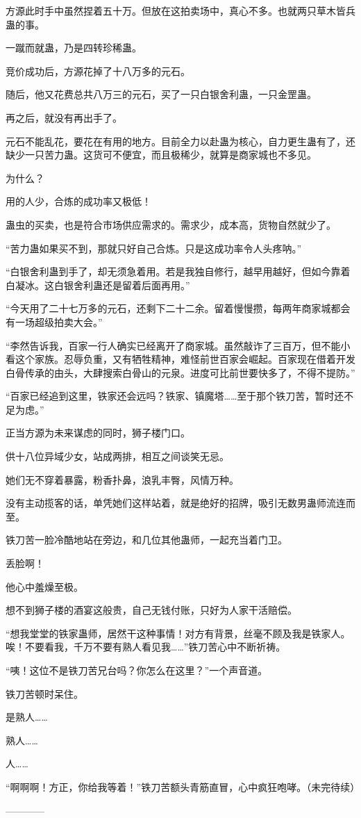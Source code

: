 \begin{this_body}
方源此时手中虽然捏着五十万。但放在这拍卖场中，真心不多。也就两只草木皆兵蛊的事。

一蹴而就蛊，乃是四转珍稀蛊。

竞价成功后，方源花掉了十八万多的元石。

随后，他又花费总共八万三的元石，买了一只白银舍利蛊，一只金罡蛊。

再之后，就没有再出手了。

元石不能乱花，要花在有用的地方。目前全力以赴蛊为核心，自力更生蛊有了，还缺少一只苦力蛊。这货可不便宜，而且极稀少，就算是商家城也不多见。

为什么？

用的人少，合炼的成功率又极低！

蛊虫的买卖，也是符合市场供应需求的。需求少，成本高，货物自然就少了。

“苦力蛊如果买不到，那就只好自己合炼。只是这成功率令人头疼呐。”

“白银舍利蛊到手了，却无须急着用。若是我独自修行，越早用越好，但如今靠着白凝冰。这白银舍利蛊还是留着后面再用。”

“今天用了二十七万多的元石，还剩下二十二余。留着慢慢攒，每两年商家城都会有一场超级拍卖大会。”

“李然告诉我，百家一行人确实已经离开了商家城。虽然敲诈了三百万，但不能小看这个家族。忍辱负重，又有牺牲精神，难怪前世百家会崛起。百家现在借着开发白骨传承的由头，大肆搜索白骨山的元泉。进度可比前世要快多了，不得不提防。”

“百家已经追到这里，铁家还会远吗？铁家、镇魔塔……至于那个铁刀苦，暂时还不足为虑。”

正当方源为未来谋虑的同时，狮子楼门口。

供十八位异域少女，站成两排，相互之间谈笑无忌。

她们无不穿着暴露，粉香扑鼻，浪乳丰臀，风情万种。

没有主动揽客的话，单凭她们这样站着，就是绝好的招牌，吸引无数男蛊师流连而至。

铁刀苦一脸冷酷地站在旁边，和几位其他蛊师，一起充当着门卫。

丢脸啊！

他心中羞燥至极。

想不到狮子楼的酒宴这般贵，自己无钱付账，只好为人家干活赔偿。

“想我堂堂的铁家蛊师，居然干这种事情！对方有背景，丝毫不顾及我是铁家人。唉！不要看我，千万不要有熟人看见我……”铁刀苦心中不断祈祷。

“咦！这位不是铁刀苦兄台吗？你怎么在这里？”一个声音道。

铁刀苦顿时呆住。

是熟人……

熟人……

人……

“啊啊啊！方正，你给我等着！”铁刀苦额头青筋直冒，心中疯狂咆哮。（未完待续）

------------

\end{this_body}

